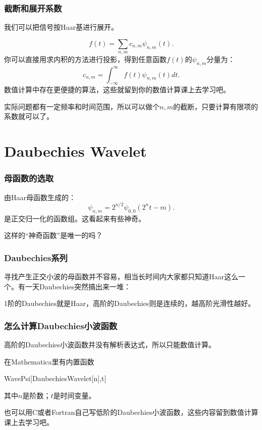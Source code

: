 \documentclass[CJK]{beamer}
\begin{document}



\begin{frame}
  \frametitle{截断和展开系数}

  我们可以把信号按Haar基进行展开。

  $$f(t) = \sum_{n,m}c_{n,m}\psi_{n,m}(t).$$
  你可以直接用求内积的方法进行投影，得到任意函数$f(t)$的$\psi_{n,m}$分量为：
  $$c_{n,m} = \int_{-\infty}^\infty f(t) \psi_{n,m}(t) dt. $$
  数值计算中存在更便捷的算法，这些就留到你的数值计算课上去学习吧。


  \skiplines
  
  实际问题都有一定频率和时间范围，所以可以做个$n,m$的截断，只要计算有限项的系数就可以了。
\end{frame}



\section{Daubechies Wavelet}


\begin{frame}
  \frametitle{母函数的选取}
  由Haar母函数生成的：
  $$\psi_{n,m} = 2^{n/2}\psi_{0,0}(2^n t - m).$$
  是正交归一化的函数组。这看起来有些神奇。

  这样的“神奇函数”是唯一的吗？
\end{frame}


\begin{frame}
  \frametitle{Daubechies系列}
  寻找产生正交小波的母函数并不容易，相当长时间内大家都只知道Haar这么一个。有一天Daubechies突然搞出来一堆：

  \emini
  1阶的Daubechies就是Haar，高阶的Daubechies则是连续的，越高阶光滑性越好。
  \emini
\end{frame}


\begin{frame}
  \frametitle{怎么计算Daubechies小波函数}
  高阶的Daubechies小波函数并没有解析表达式，所以只能数值计算。

  \skiplines
  
  在Mathematica里有内置函数
  
  WavePsi[DaubechiesWavelet[n],t]

  其中$n$是阶数；$t$是时间变量。

  \skiplines
  
  也可以用C或者Fortran自己写低阶的Daubechies小波函数，这些内容留到数值计算课上去学习吧。
  
\end{frame}
\end{document}
